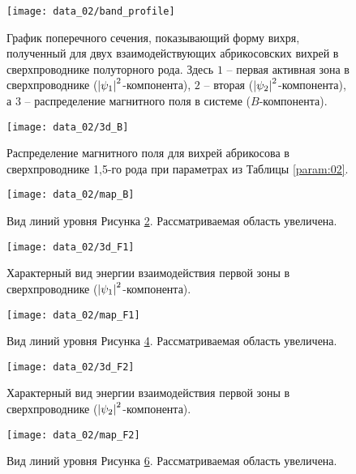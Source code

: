 \begin{figure}[h!]
    \center
    \texttt{[image: data\_02/band\_profile]}
    \caption{График поперечного сечения, показывающий форму вихря, полученный 
        для двух взаимодействующих абрикосовских вихрей в сверхпроводнике 
        полуторного рода. Здесь \( 1 \) -- первая активная зона в 
        сверхпроводнике (\( \left| \psi_1 \right|^2 \)-компонента), \( 2 \) -- вторая 
        (\( \left| \psi_2 \right|^2 \)-компонента), а \( 3 \) -- распределение 
        магнитного поля в системе (\( B \)-компонента).}
    \label{img:band-profile-02}
\end{figure}

\begin{figure}[h!]
    \center
    \texttt{[image: data\_02/3d\_B]}
    \caption{Распределение магнитного поля для вихрей абрикосова в 
        сверхпроводнике 1,5-го рода при параметрах из Таблицы \ref{param:02}.}
    \label{img:3d-field-B-02}
\end{figure}

\begin{figure}[h!]
    \center
    \texttt{[image: data\_02/map\_B]}
    \caption{Вид линий уровня Рисунка \ref{img:3d-field-B-02}. 
        Рассматриваемая область увеличена.}
    \label{img:map-field-B-02}
\end{figure}

\begin{figure}[h!]
    \center
    \texttt{[image: data\_02/3d\_F1]}
    \caption{Характерный вид энергии взаимодействия первой зоны в 
        сверхпроводнике (\( \left| \psi_1 \right|^2 \)-компонента).}
    \label{img:3d-band-1-02}
\end{figure}

\begin{figure}[h!]
    \center
    \texttt{[image: data\_02/map\_F1]}
    \caption{Вид линий уровня Рисунка \ref{img:3d-band-1-02}. 
        Рассматриваемая область увеличена.}
    \label{img:map-band-1-02}
\end{figure}

\begin{figure}[h!]
    \center
    \texttt{[image: data\_02/3d\_F2]}
    \caption{Характерный вид энергии взаимодействия первой зоны в 
        сверхпроводнике (\( \left| \psi_2 \right|^2 \)-компонента).}
    \label{img:3d-band-2-02}
\end{figure}

\begin{figure}[h!]
    \center
    \texttt{[image: data\_02/map\_F2]}
    \caption{Вид линий уровня Рисунка \ref{img:3d-band-2-02}. 
        Рассматриваемая область увеличена.}
    \label{img:map-band-2-02}
\end{figure}

